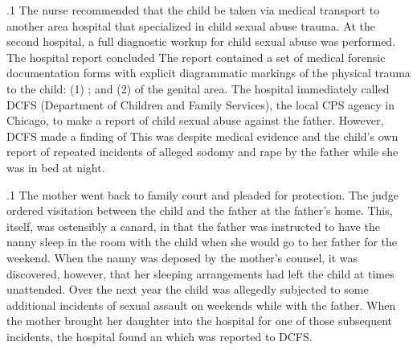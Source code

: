 \documentclass[11pt, twoside]{article}
\begin{document}
{\p.1{%
The nurse recommended that the child be taken via medical transport
to another area hospital that specialized in child sexual abuse trauma.
At the second hospital, a full diagnostic workup for child sexual abuse
was performed. The hospital report concluded  The report contained a set of medical forensic documentation
forms with explicit diagrammatic markings of the physical trauma to
the child: (1) ; and (2)  of the genital area. The
hospital immediately called DCFS (Department of Children and Family
Services), the local CPS agency in Chicago, to make a report of child
sexual abuse against the father. However, DCFS made a finding of  This was despite medical evidence and the child's own report
of repeated incidents of alleged sodomy and rape by the father while she
was in bed at night.
}%

\p.1{%
The mother went back to family court and pleaded for protection.
The judge ordered  visitation between the child and the father at the father's home. This, itself, was ostensibly a canard, in that
the father was instructed to have the nanny sleep in the room with
the child when she would go to her father for the weekend. When the
nanny was deposed by the mother's counsel, it was discovered, however, that her
sleeping arrangements had left the child at times unattended. Over the
next year the child was allegedly subjected to some additional incidents
of sexual assault on weekends while with the father. When the mother
brought her daughter into the hospital for one of those subsequent incidents, the hospital found an  which was reported to
DCFS.
}%

}
\end{document}
